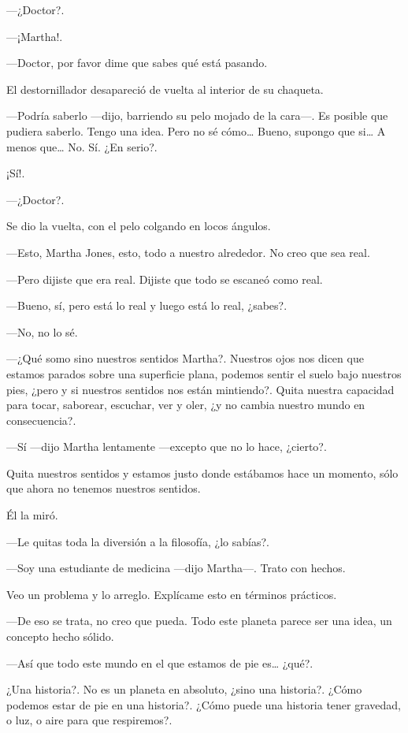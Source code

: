 ---¿Doctor?.

---¡Martha!.

---Doctor, por favor dime que sabes qué está pasando.

El destornillador desapareció de vuelta al interior de su chaqueta.

---Podría saberlo ---dijo, barriendo su pelo mojado de la cara---. Es posible que pudiera saberlo. Tengo una idea. Pero no sé cómo\ldots{} Bueno, supongo que si\ldots{} A menos que\ldots{} No. Sí. ¿En serio?.

¡Sí!.

---¿Doctor?.

Se dio la vuelta, con el pelo colgando en locos ángulos.

---Esto, Martha Jones, esto, todo a nuestro alrededor. No creo que sea real.

---Pero dijiste que era real. Dijiste que todo se escaneó como real.

---Bueno, sí, pero está lo real y luego está lo real, ¿sabes?.

---No, no lo sé.

---¿Qué somo sino nuestros sentidos Martha?. Nuestros ojos nos dicen que estamos parados sobre una superficie plana, podemos sentir el suelo bajo nuestros pies, ¿pero y si nuestros sentidos nos están mintiendo?. Quita nuestra capacidad para tocar, saborear, escuchar, ver y oler, ¿y no cambia nuestro mundo en consecuencia?.

---Sí ---dijo Martha lentamente ---excepto que no lo hace, ¿cierto?.

Quita nuestros sentidos y estamos justo donde estábamos hace un momento, sólo que ahora no tenemos nuestros sentidos.

Él la miró.

---Le quitas toda la diversión a la filosofía, ¿lo sabías?.

---Soy una estudiante de medicina ---dijo Martha---. Trato con hechos.

Veo un problema y lo arreglo. Explícame esto en términos prácticos.

---De eso se trata, no creo que pueda. Todo este planeta parece ser una idea, un concepto hecho sólido.

---Así que todo este mundo en el que estamos de pie es\ldots{} ¿qué?.

¿Una historia?. No es un planeta en absoluto, ¿sino una historia?. ¿Cómo podemos estar de pie en una historia?. ¿Cómo puede una historia tener gravedad, o luz, o aire para que respiremos?.

